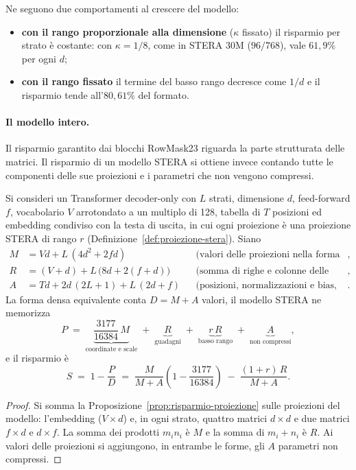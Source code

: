 Ne seguono due comportamenti al crescere del modello:
\begin{itemize}
\item \textbf{con il rango proporzionale alla dimensione} ($\kappa$ fissato) il risparmio per strato è costante: con $\kappa=1/8$, come in STERA 30M ($96/768$), vale $61{,}9\%$ per ogni $d$;
\item \textbf{con il rango fissato} il termine del basso rango decresce come $1/d$ e il risparmio tende all'$80{,}61\%$ del formato.
\end{itemize}

\paragraph{Il modello intero.} Il risparmio garantito dai blocchi RowMask23 riguarda la parte strutturata delle matrici. Il risparmio di un modello STERA si ottiene invece contando tutte le componenti delle sue proiezioni e i parametri che non vengono compressi.

\begin{proposizione}
\label{prop:risparmio-modello}
Si consideri un Transformer decoder-only con $L$ strati, dimensione $d$, feed-forward $f$, vocabolario $V$ arrotondato a un multiplo di 128, tabella di $T$ posizioni ed embedding condiviso con la testa di uscita, in cui ogni proiezione è una proiezione STERA di rango $r$ (Definizione~\ref{def:proiezione-stera}). Siano
\[
\begin{aligned}
M &= V d + L\,(4d^2 + 2fd) &&\text{(valori delle proiezioni nella forma densa)},\\
R &= (V+d) + L\,\big(8d + 2(f+d)\big) &&\text{(somma di righe e colonne delle proiezioni)},\\
A &= T d + 2d\,(2L+1) + L\,(2d+f) &&\text{(posizioni, normalizzazioni e bias, non compressi)}.
\end{aligned}
\]
La forma densa equivalente conta $D = M + A$ valori, il modello STERA ne memorizza
\[
P \;=\; \underbrace{\frac{3177}{16384}\,M}_{\text{coordinate e scale}} \;+\; \underbrace{R}_{\text{guadagni}} \;+\; \underbrace{r\,R}_{\text{basso rango}} \;+\; \underbrace{A}_{\text{non compressi}},
\]
e il risparmio è
\[
S \;=\; 1 - \frac{P}{D} \;=\; \frac{M}{M+A}\left(1-\frac{3177}{16384}\right) \;-\; \frac{(1+r)\,R}{M+A}.
\]
\end{proposizione}

\begin{proof}
Si somma la Proposizione~\ref{prop:risparmio-proiezione} sulle proiezioni del modello: l'embedding ($V\times d$) e, in ogni strato, quattro matrici $d\times d$ e due matrici $f\times d$ e $d\times f$. La somma dei prodotti $m_i n_i$ è $M$ e la somma di $m_i+n_i$ è $R$. Ai valori delle proiezioni si aggiungono, in entrambe le forme, gli $A$ parametri non compressi.
\end{proof}

